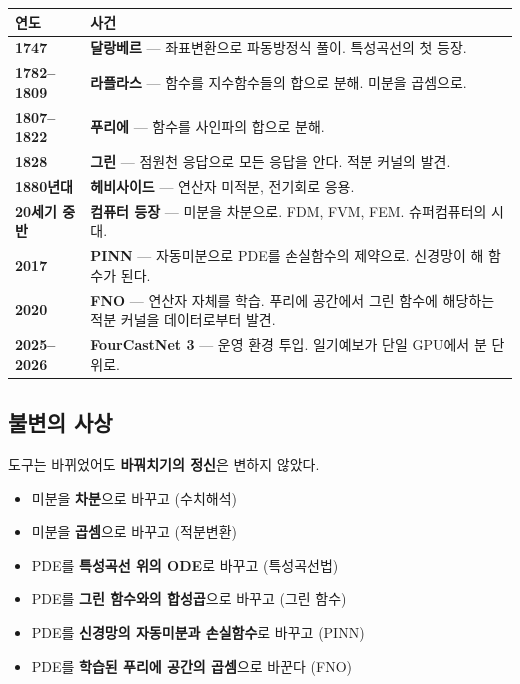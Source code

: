 \documentclass[11pt,a4paper]{article}
\begin{document}
\begin{center}
\begin{tabular}{p{2.5cm}p{11.5cm}}
\toprule
연도 & 사건 \\
\midrule
\textbf{1747} & \textbf{달랑베르} --- 좌표변환으로 파동방정식 풀이. 특성곡선의 첫 등장. \\
\textbf{1782--1809} & \textbf{라플라스} --- 함수를 지수함수들의 합으로 분해. 미분을 곱셈으로. \\
\textbf{1807--1822} & \textbf{푸리에} --- 함수를 사인파의 합으로 분해. \\
\textbf{1828} & \textbf{그린} --- 점원천 응답으로 모든 응답을 안다. 적분 커널의 발견. \\
\textbf{1880년대} & \textbf{헤비사이드} --- 연산자 미적분, 전기회로 응용. \\
\textbf{20세기 중반} & \textbf{컴퓨터 등장} --- 미분을 차분으로. FDM, FVM, FEM. 슈퍼컴퓨터의 시대. \\
\textbf{2017} & \textbf{PINN} --- 자동미분으로 PDE를 손실함수의 제약으로. 신경망이 해 함수가 된다. \\
\textbf{2020} & \textbf{FNO} --- 연산자 자체를 학습. 푸리에 공간에서 그린 함수에 해당하는 적분 커널을 데이터로부터 발견. \\
\textbf{2025--2026} & \textbf{FourCastNet 3} --- 운영 환경 투입. 일기예보가 단일 GPU에서 분 단위로. \\
\bottomrule
\end{tabular}
\end{center}

\subsection{불변의 사상}

도구는 바뀌었어도 \textbf{바꿔치기의 정신}은 변하지 않았다.

\begin{itemize}
\item 미분을 \textbf{차분}으로 바꾸고 (수치해석)
\item 미분을 \textbf{곱셈}으로 바꾸고 (적분변환)
\item PDE를 \textbf{특성곡선 위의 ODE}로 바꾸고 (특성곡선법)
\item PDE를 \textbf{그린 함수와의 합성곱}으로 바꾸고 (그린 함수)
\item PDE를 \textbf{신경망의 자동미분과 손실함수}로 바꾸고 (PINN)
\item PDE를 \textbf{학습된 푸리에 공간의 곱셈}으로 바꾼다 (FNO)
\end{itemize}
\end{document}
